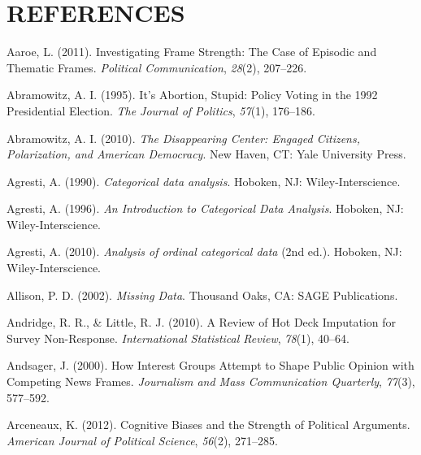 \documentclass[12pt,econ]{sources/authesis}
\begin{document}
\hypertarget{references}{%
\chapter*{REFERENCES}\label{references}}

\noindent

\ssp

\hypertarget{refs}{}
\leavevmode\hypertarget{ref-aaroe_investigating_2011}{}%
Aaroe, L. (2011). Investigating Frame Strength: The Case of Episodic and Thematic Frames. \emph{Political Communication}, \emph{28}(2), 207--226.

\leavevmode\hypertarget{ref-abramowitz_1995_abortion}{}%
Abramowitz, A. I. (1995). It's Abortion, Stupid: Policy Voting in the 1992 Presidential Election. \emph{The Journal of Politics}, \emph{57}(1), 176--186.

\leavevmode\hypertarget{ref-abramowitz_disappearing_2010}{}%
Abramowitz, A. I. (2010). \emph{The Disappearing Center: Engaged Citizens, Polarization, and American Democracy}. New Haven, CT: Yale University Press.

\leavevmode\hypertarget{ref-agresti_1990_categorical}{}%
Agresti, A. (1990). \emph{Categorical data analysis}. Hoboken, NJ: Wiley-Interscience.

\leavevmode\hypertarget{ref-agresti_1996_introduction}{}%
Agresti, A. (1996). \emph{An Introduction to Categorical Data Analysis}. Hoboken, NJ: Wiley-Interscience.

\leavevmode\hypertarget{ref-agresti_2010_analysis}{}%
Agresti, A. (2010). \emph{Analysis of ordinal categorical data} (2nd ed.). Hoboken, NJ: Wiley-Interscience.

\leavevmode\hypertarget{ref-allison_2002_missing}{}%
Allison, P. D. (2002). \emph{Missing Data}. Thousand Oaks, CA: SAGE Publications.

\leavevmode\hypertarget{ref-andridge_2010_review}{}%
Andridge, R. R., \& Little, R. J. (2010). A Review of Hot Deck Imputation for Survey Non-Response. \emph{International Statistical Review}, \emph{78}(1), 40--64.

\leavevmode\hypertarget{ref-andsager_how_2000}{}%
Andsager, J. (2000). How Interest Groups Attempt to Shape Public Opinion with Competing News Frames. \emph{Journalism and Mass Communication Quarterly}, \emph{77}(3), 577--592.

\leavevmode\hypertarget{ref-arceneaux_cognitive_2012}{}%
Arceneaux, K. (2012). Cognitive Biases and the Strength of Political Arguments. \emph{American Journal of Political Science}, \emph{56}(2), 271--285.
\end{document}

